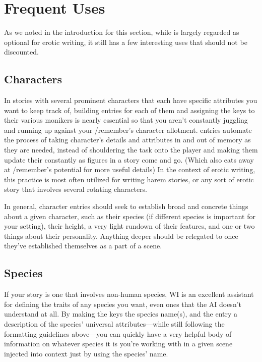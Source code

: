 ﻿\documentclass[Coomer-main.tex]{subfiles}
\begin{document}
\section{Frequent Uses}

As we noted in the introduction for this section, while \wi is largely regarded as optional for erotic writing, it still has a few interesting uses that should not be discounted.

\subsection{Characters}

In stories with several prominent characters that each have specific attributes you want to keep track of, building \wi entries for each of them and assigning the keys to their various monikers is nearly essential so that you aren’t constantly juggling and running up against your /remember’s character allotment. \wi entries automate the process of taking character’s details and attributes in and out of memory as they are needed, instead of shouldering the task onto the player and making them update their \rem constantly as figures in a story come and go. (Which also eats away at /remember’s potential for more useful details) In the context of erotic writing, this practice is most often utilized for writing harem stories, or any sort of erotic story that involves several rotating characters.

In general, character entries should seek to establish broad and concrete things about a given character, such as their species (if different species is important for your setting), their height, a very light rundown of their features, and one or two things about their personality. Anything deeper should be relegated to \rem once they've established themselves as a part of a scene.

\subsection{Species}

If your story is one that involves non-human species, WI is an excellent assistant for defining the traits of any species you want, even ones that the AI doesn't understand at all. By making the keys the species name(s), and the entry a description of the species' universal attributes—while still following the formatting guidelines above—you can quickly have a very helpful body of information on whatever species it is you're working with in a given scene injected into context just by using the species' name.
\end{document}
